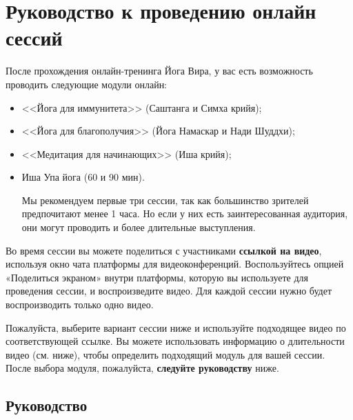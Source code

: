 \newpage
\section*{Руководство к проведению онлайн сессий}
\label{sec:online}

После прохождения онлайн-тренинга Йога Вира, у вас есть возможность проводить следующие модули онлайн:  %
\begin{itemize}
\item <<Йога для иммунитета>> (Саштанга и Симха крийя);
\item <<Йога для благополучия>> (Йога Намаскар и Нади Шуддхи);
\item <<Медитация для начинающих>> (Иша крийя);
\item Иша Упа йога (60 и 90 мин).

    Мы рекомендуем первые три сессии, так как большинство зрителей предпочитают менее 1 часа. Но если у них есть заинтересованная аудитория, они могут проводить и более длительные выступления.
\end{itemize}


Во время сессии вы можете поделиться с участниками \textbf{ссылкой на видео}, используя окно чата платформы для видеоконференций. Воспользуйтесь опцией
«Поделиться экраном» внутри платформы, которую вы используете для
проведения сессии, и воспроизведите видео.
Для каждой сессии нужно будет воспроизводить только одно видео.

Пожалуйста, выберите вариант сессии ниже и используйте подходящее видео по соответствующей ссылке. Вы можете использовать информацию о длительности видео (см. ниже), чтобы определить подходящий модуль для вашей сессии.
После выбора модуля, пожалуйста, \textbf{следуйте руководству} ниже.

\subsection*{Руководство}
\label{sec:list}

